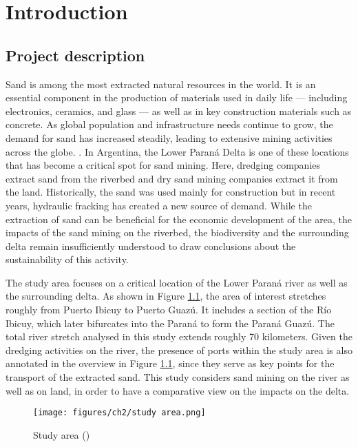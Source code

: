 \chapter{Introduction}
\label{chapter:introduction}

\section{Project description}
Sand is among the most extracted natural resources in the world. It is an essential component in the production of materials used in daily life — including electronics, ceramics, and glass — as well as in key construction materials such as concrete. As global population and infrastructure needs continue to grow, the demand for sand has increased steadily, leading to extensive mining activities across the globe. \autocite{wwfRisingDemandSand}. 
In Argentina, the Lower Paraná Delta is one of these locations that has become a critical spot for sand mining. Here, dredging companies extract  sand from the riverbed and dry sand mining companies extract it from the land. Historically, the sand was used mainly for construction but in recent years, hydraulic fracking has created a new source of demand.
While the extraction of sand can be beneficial for the economic development of the area, the impacts of the sand mining on the riverbed, the biodiversity and the surrounding delta remain insufficiently understood to draw conclusions about the sustainability of this activity. 
 
The study area focuses on a critical location of the Lower Paraná river as well as the surrounding delta. As shown in Figure \ref{fig:study area}, the area of interest stretches roughly from Puerto Ibicuy to Puerto Guazú. It includes a section of the Río Ibicuy, which later bifurcates into the Paraná to form the Paraná Guazú. The total river stretch analysed in this study extends roughly 70 kilometers. Given the dredging activities on the river, the presence of ports within the study area is also annotated in the overview in Figure \ref{fig:study area}, since they serve as key points for the transport of the extracted sand. This study considers sand mining on the river as well as on land, in order to have a comparative view on the impacts on the delta.

\begin{figure}[H]
    \centering    \texttt{[image: figures/ch2/study area.png]}
    \caption{Study area (\cite{googleearth2025})}
    \label{fig:study area}
\end{figure}


